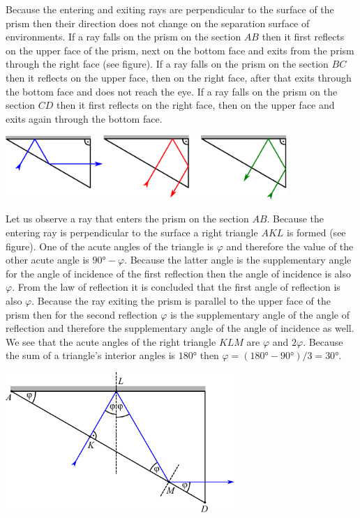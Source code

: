 \solueng
\osa Because the entering and exiting rays are perpendicular to the surface of the prism then their direction does not change on the separation surface of environments. If a ray falls on the prism on the section $AB$ then it first reflects on the upper face of the prism, next on the bottom face and exits from the prism through the right face (see figure). If a ray falls on the prism on the section $BC$ then it reflects on the upper face, then on the right face, after that exits through the bottom face and does not reach the eye. If a ray falls on the prism on the section $CD$ then it first reflects on the right face, then on the upper face and exits again through the bottom face. 
\begin{center}
  \includegraphics[width=0.8\textwidth]{2014-v3g-04-periskoopprillid_lahendus_joonis1}
\end{center}
\osa Let us observe a ray that enters the prism on the section $AB$. Because the entering ray is perpendicular to the surface a right triangle $AKL$ is formed (see figure). One of the acute angles of the triangle is $\varphi$ and therefore the value of the other acute angle is $\ang{90}-\varphi$. Because the latter angle is the supplementary angle for the angle of incidence of the first reflection then the angle of incidence is also $\varphi$. From the law of reflection it is concluded that the first angle of reflection is also $\varphi$. Because the ray exiting the prism is parallel to the upper face of the prism then for the second reflection $\varphi$ is the supplementary angle of the angle of reflection and therefore the supplementary angle of the angle of incidence as well. We see that the acute angles of the right triangle $KLM$ are $\varphi$ and $2\varphi$. Because the sum of a triangle’s interior angles is $\ang{180}$ then $\varphi=(\ang{180}-\ang{90})/3=\ang{30}$.
\begin{center}
  \includegraphics[width=0.65\textwidth]{2014-v3g-04-periskoopprillid_lahendus_joonis2}
\end{center}
